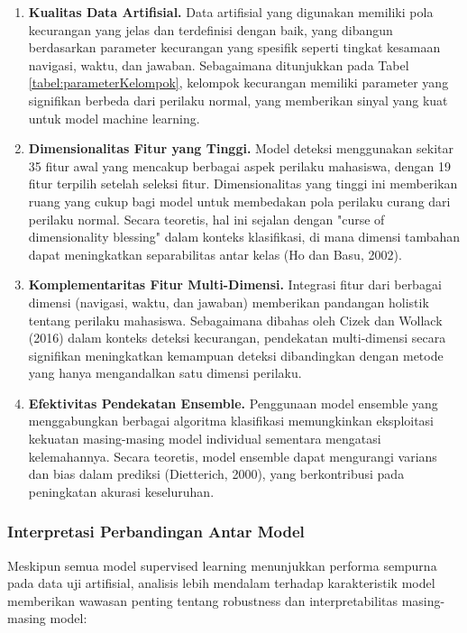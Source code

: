 \begin{enumerate}
    \item \textbf{Kualitas Data Artifisial.} Data artifisial yang digunakan memiliki pola kecurangan yang jelas dan terdefinisi dengan baik, yang dibangun berdasarkan parameter kecurangan yang spesifik seperti tingkat kesamaan navigasi, waktu, dan jawaban. Sebagaimana ditunjukkan pada Tabel \ref{tabel:parameterKelompok}, kelompok kecurangan memiliki parameter yang signifikan berbeda dari perilaku normal, yang memberikan sinyal yang kuat untuk model machine learning.

    \item \textbf{Dimensionalitas Fitur yang Tinggi.} Model deteksi menggunakan sekitar 35 fitur awal yang mencakup berbagai aspek perilaku mahasiswa, dengan 19 fitur terpilih setelah seleksi fitur. Dimensionalitas yang tinggi ini memberikan ruang yang cukup bagi model untuk membedakan pola perilaku curang dari perilaku normal. Secara teoretis, hal ini sejalan dengan "curse of dimensionality blessing" dalam konteks klasifikasi, di mana dimensi tambahan dapat meningkatkan separabilitas antar kelas (Ho dan Basu, 2002).

    \item \textbf{Komplementaritas Fitur Multi-Dimensi.} Integrasi fitur dari berbagai dimensi (navigasi, waktu, dan jawaban) memberikan pandangan holistik tentang perilaku mahasiswa. Sebagaimana dibahas oleh Cizek dan Wollack (2016) dalam konteks deteksi kecurangan, pendekatan multi-dimensi secara signifikan meningkatkan kemampuan deteksi dibandingkan dengan metode yang hanya mengandalkan satu dimensi perilaku.

    \item \textbf{Efektivitas Pendekatan Ensemble.} Penggunaan model ensemble yang menggabungkan berbagai algoritma klasifikasi memungkinkan eksploitasi kekuatan masing-masing model individual sementara mengatasi kelemahannya. Secara teoretis, model ensemble dapat mengurangi varians dan bias dalam prediksi (Dietterich, 2000), yang berkontribusi pada peningkatan akurasi keseluruhan.
\end{enumerate}

\subsubsection{Interpretasi Perbandingan Antar Model}

Meskipun semua model supervised learning menunjukkan performa sempurna pada data uji artifisial, analisis lebih mendalam terhadap karakteristik model memberikan wawasan penting tentang robustness dan interpretabilitas masing-masing model:

